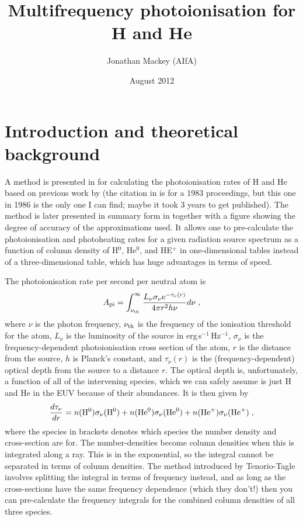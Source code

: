 \documentclass[a4paper,11pt]{article}
\title{Multifrequency photoionisation for H and He}
\author{Jonathan Mackey (AIfA)}
\date{August 2012}
\begin{document}
\maketitle

\section{Introduction and theoretical background}
A method is presented in \citet{FraMel94} for calculating the photoionisation rates of H and He based on previous work by \citet{TenBodNor86} (the citation in \citealt{FraMel94}  is for a 1983 proceedings, but this one in 1986 is the only one I can find; maybe it took 3 years to get published).
The method is later presented in summary form in \citet{RodTen98} together with a figure showing the degree of accuracy of the approximations used.
It allows one to pre-calculate the photoionisation and photoheating rates for a given radiation source spectrum as a function of column density of H$^0$, He$^0$, and HE$^+$ in one-dimensional tables instead of a three-dimensional table, which has huge advantages in terms of speed.

The photoionisation rate per second per neutral atom is 
\begin{equation}
A_{\mathrm{pi}} = \int_{\nu_{\mathrm{th}}}^{\infty}
    \frac{L_\nu\sigma_\nu \mathrm{e}^{-\tau_\nu(r)}}{4\pi r^2 h\nu} d\nu \;,
\label{eqn:pion_rate}
\end{equation}
where $\nu$ is the photon frequency,
$\nu_{\mathrm{th}}$ is the frequency of the ionisation threshold for the atom, 
$L_\nu$ is the luminosity of the source in erg\,s$^{-1}$\,Hz$^{-1}$,
$\sigma_\nu$ is the frequency-dependent photoionisation cross section of the atom,
$r$ is the distance from the source, $h$ is Planck's constant, and
$\tau_\nu(r)$ is the (frequency-dependent) optical depth from the source to a distance $r$.
The optical depth is, unfortunately, a function of all of the intervening species, which we can safely assume is just H and He in the EUV because of their abundances.
It is then given by
\begin{equation}
\frac{d\tau_\nu}{dr} = n(\mathrm{H}^0)\sigma_\nu(\mathrm{H}^0)
                      +n(\mathrm{He}^0)\sigma_\nu(\mathrm{He}^0)
                      +n(\mathrm{He}^+)\sigma_\nu(\mathrm{He}^+) \;,
\end{equation}
where the species in brackets denotes which species the number density and cross-section are for.
The number-densities become column densities when this is integrated along a ray.
This is in the exponential, so the integral cannot be separated in terms of column densities.
The method introduced by Tenorio-Tagle involves splitting the integral in terms of frequency instead, and as long as the cross-sections have the same frequency dependence (which they don't!) then you can pre-calculate the frequency integrals for the combined column densities of all three species.
\end{document}
